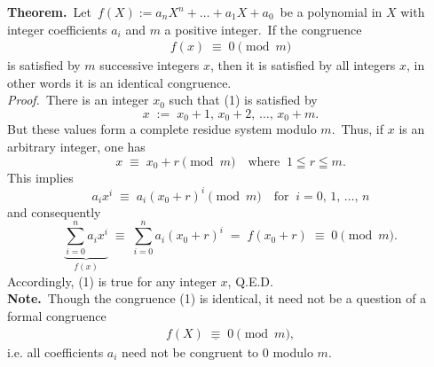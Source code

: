 \documentclass[12pt]{article}
\theoremstyle{definition}
\begin{document}
\textbf{Theorem.}\, Let\, $f(X) := a_nX^n+\ldots+a_1X+a_0$\, be a polynomial in $X$ with integer coefficients $a_i$ and $m$ a positive integer.\, If the congruence
\begin{align}
f(x) \;\equiv\; 0 \pmod{m}
\end{align}
is satisfied by $m$ successive integers $x$, then it is satisfied by all integers $x$, in other words it is an identical congruence.\\


\emph{Proof.}\, There is an integer $x_0$ such that (1) is satisfied by
$$x \;:=\; x_0\!+\!1,\,x_0\!+\!2,\,\ldots,\,x_0\!+\!m.$$
But these values form a complete residue system modulo $m$.\, Thus, if $x$ is an arbitrary integer, one has
$$x \;\equiv\; x_0\!+\!r \pmod{m} \quad\mbox{where}\;\; 1\leqq r \leqq m.$$
This implies
$$a_ix^i \;\equiv\; a_i(x_0\!+\!r)^i \pmod{m} \quad\mbox{for}\;\; i = 0,\,1,\,\ldots,\,n$$
and consequently
$$\underbrace{\sum_{i=0}^na_ix^i}_{f(x)} \;\equiv\; \sum_{i=0}^na_i(x_0\!+\!r)^i \;=\; f(x_0\!+\!r) \;\equiv\; 0 
\pmod{m}.$$
Accordingly, (1) is true for any integer $x$, Q.E.D.\\

\textbf{Note.}\, Though the congruence (1) is identical, it need not be a question of a formal congruence
\begin{align}
f(X) \;\underline{\equiv}\; 0 \pmod{m},
\end{align}
i.e. all coefficients $a_i$ need not be congruent to 0 modulo $m$.



\end{document}
